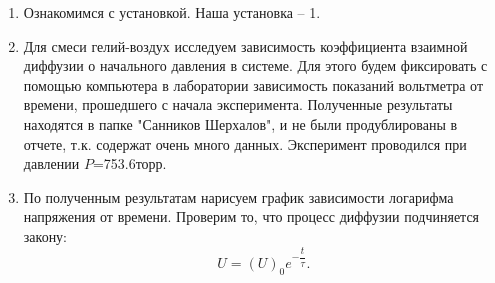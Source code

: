 \documentclass[a4paper,12pt]{article}
\theoremstyle{definition}
\begin{document}
		\begin{enumerate}
			\item Ознакомимся с установкой. Наша установка -- 1.
			
			\item Для смеси гелий-воздух исследуем зависимость коэффициента взаимной диффузии о начального давления в системе. Для этого будем фиксировать с помощью компьютера в лаборатории зависимость показаний вольтметра от времени, прошедшего с начала эксперимента. Полученные результаты находятся в папке "Санников Шерхалов", и не были продублированы в отчете, т.к. содержат очень много данных. Эксперимент проводился при давлении $P$=753.6торр. 
			
			\item По полученным результатам нарисуем график зависимости логарифма напряжения от времени. Проверим то, что процесс диффузии подчиняется закону: \[U = (U)_0e^{-\dfrac{t}{\tau}}.\]
			

\end{enumerate}
\end{document}
